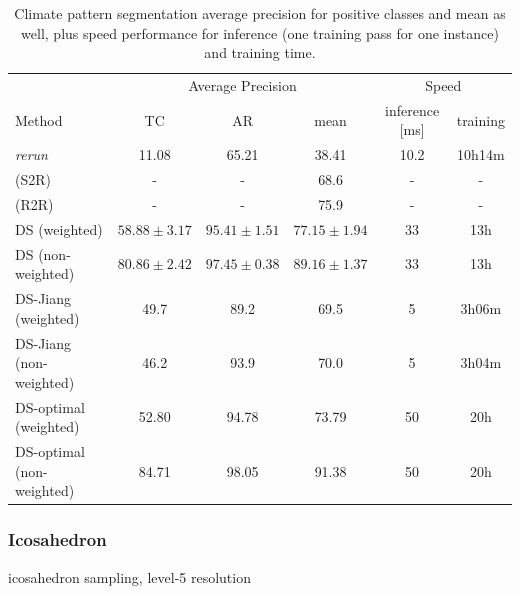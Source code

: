 \documentclass{article} %
\begin{document}
\begin{table}
\begin{tabular}{l|c c c c c}
        \multicolumn{1}{l}{} & \multicolumn{3}{c}{Average Precision} & \multicolumn{2}{c}{Speed}\\
        \cmidrule(lr){2-4}\cmidrule(lr){5-6}
        \multicolumn{1}{l}{Method} & TC & AR & mean & inference [ms] & training \\ \hline
        \cite{jiang2019sphericalcnn} \emph{rerun} & 11.08 & 65.21 & 38.41 & 10.2 & 10h14m\\
        \cite{cohen2019gauge} (S2R) & - & -& 68.6 & - & - \\
        \cite{cohen2019gauge} (R2R) & - & -& 75.9 & - & -\\ \hline
        DS (weighted) & $58.88\pm 3.17$ & $95.41\pm 1.51$ & $77.15\pm 1.94$ & 33 & 13h \\
        DS (non-weighted) & $80.86\pm 2.42$ & $97.45\pm 0.38$ & $89.16\pm 1.37$ & 33 & 13h \\ \hline
        DS-Jiang (weighted) & 49.7 & 89.2 & 69.5 & 5 & 3h06m\\
        DS-Jiang (non-weighted) & 46.2 & 93.9 & 70.0 & 5 & 3h04m \\ \hline
        DS-optimal (weighted) & 52.80 & 94.78 & 73.79 & 50 & 20h \\
        DS-optimal (non-weighted) & 84.71 & 98.05 & 91.38 & 50 & 20h \\ \hline
    \end{tabular}
    \caption{Climate pattern segmentation average precision for positive classes and mean as well, plus speed performance for inference (one training pass for one instance)  and training time.}
\end{table}

\subsubsection*{Icosahedron}

icosahedron sampling, level-5 resolution
\end{document}
